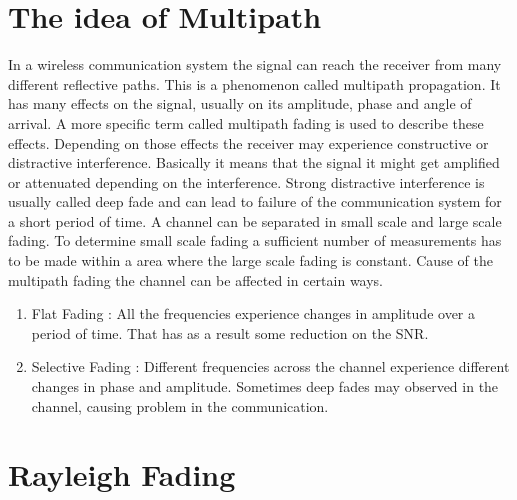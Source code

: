 \section{The idea of Multipath}

In a wireless communication system the signal can reach the receiver from many different reflective paths. This is a phenomenon called multipath propagation. It has many effects on the signal, usually on its amplitude, phase and angle of arrival.\citep{Fading} A more specific term called multipath fading is used to describe these effects. Depending on those effects the receiver may experience constructive or distractive interference. Basically it means that the signal it might get amplified or attenuated depending on the interference. Strong distractive interference is usually called deep fade and can lead to failure of the communication system for a short period of time. A  channel can be separated in  small scale and large scale fading. To determine small scale fading a sufficient number of measurements has to be made within a area where the large scale fading is constant. Cause of the multipath fading the channel can be affected in certain ways.
	\begin{enumerate}
	\item Flat Fading : All the frequencies experience changes in amplitude over a period of time. That has as a result some reduction on the SNR.
	\item Selective Fading : Different frequencies across the channel experience different changes in phase and amplitude. Sometimes deep fades may observed in the channel, causing problem in the communication.\citep{FlatSelective}
	\end{enumerate}



	
\section{Rayleigh Fading}

